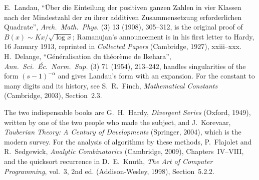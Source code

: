 E.~Landau, ``\"Uber die Einteilung der positiven ganzen Zahlen in vier Klassen nach der Mindestzahl der zu ihrer additiven Zusammensetzung erforderlichen
Quadrate'', \emph{Arch.\ Math.\ Phys.} (3) 13 (1908), 305--312, is the original proof of $B(x)\sim Kx/\sqrt{\log x}$; Ramanujan's announcement is in his
first letter to Hardy, 16 January 1913, reprinted in \emph{Collected Papers} (Cambridge, 1927), xxiii--xxx. H.~Delange, ``G\'en\'eralisation du
th\'eor\`eme de Ikehara'', \emph{Ann.\ Sci.\ \'Ec.\ Norm.\ Sup.} (3) 71 (1954), 213--242, handles singularities of the form $(s-1)^{-\alpha}$ and gives
Landau's form with an expansion. For the constant to many digits and its history, see S.~R.~Finch, \emph{Mathematical Constants} (Cambridge, 2003),
Section~2.3.

The two indispensable books are G.~H.~Hardy, \emph{Divergent Series} (Oxford, 1949), written by one of the two people who made the subject, and
J.~Korevaar, \emph{Tauberian Theory: A Century of Developments} (Springer, 2004), which is the modern survey. For the analysis of algorithms by these
methods, P.~Flajolet and R.~Sedgewick, \emph{Analytic Combinatorics} (Cambridge, 2009), Chapters~IV--VIII, and the quicksort recurrence in
D.~E.~Knuth, \emph{The Art of Computer Programming}, vol.~3, 2nd ed. (Addison-Wesley, 1998), Section~5.2.2.

